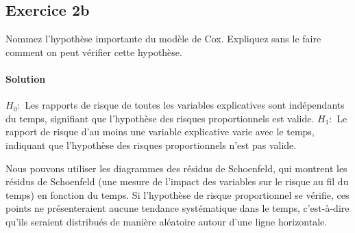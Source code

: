 \documentclass[../main.tex]{subfiles}
\begin{document}
\begin{CJK*}{UTF8}{gbsn}
    
\section*{Exercice 2b}
Nommez l'hypothèse importante du modèle de Cox. 
Expliquez sans le faire comment on peut vérifier cette hypothèse.
    
\paragraph{Solution}
    
$H_0:$ Les rapports de risque de toutes les variables explicatives 
sont indépendants du temps, signifiant que l'hypothèse des risques proportionnels est valide.
$H_1:$ Le rapport de risque d'au moins une variable 
explicative varie avec le temps, indiquant que l'hypothèse des risques proportionnels n'est pas valide.
    
Nous pouvons utiliser les diagrammes des résidus de Schoenfeld, 
qui montrent les résidus de Schoenfeld 
(une mesure de l'impact des variables sur le risque au fil du temps) 
en fonction du temps. Si l'hypothèse de risque proportionnel se vérifie, 
ces points ne présenteraient aucune tendance systématique dans le temps, 
c'est-à-dire qu'ils seraient distribués de manière aléatoire autour d'une ligne horizontale.

\end{CJK*}
\end{document}
